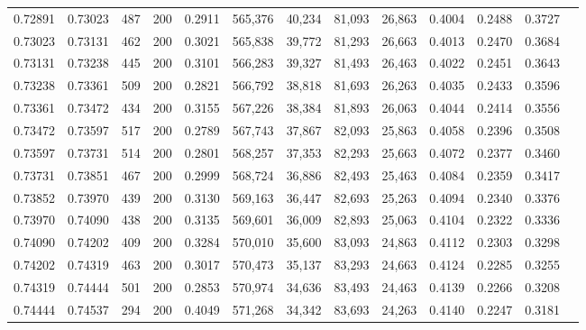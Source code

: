 \begin{tabular}{rrrrrrrrrrrrr}
0.72891 & 0.73023 &   487 & 200 &                                     0.2911 & 565,376 &  40,234 &  81,093 &  26,863 & 0.4004 & 0.2488 & 0.3727 \\
0.73023 & 0.73131 &   462 & 200 &                                     0.3021 & 565,838 &  39,772 &  81,293 &  26,663 & 0.4013 & 0.2470 & 0.3684 \\
0.73131 & 0.73238 &   445 & 200 &                                     0.3101 & 566,283 &  39,327 &  81,493 &  26,463 & 0.4022 & 0.2451 & 0.3643 \\
0.73238 & 0.73361 &   509 & 200 &                                     0.2821 & 566,792 &  38,818 &  81,693 &  26,263 & 0.4035 & 0.2433 & 0.3596 \\
0.73361 & 0.73472 &   434 & 200 &                                     0.3155 & 567,226 &  38,384 &  81,893 &  26,063 & 0.4044 & 0.2414 & 0.3556 \\
0.73472 & 0.73597 &   517 & 200 &                                     0.2789 & 567,743 &  37,867 &  82,093 &  25,863 & 0.4058 & 0.2396 & 0.3508 \\
0.73597 & 0.73731 &   514 & 200 &                                     0.2801 & 568,257 &  37,353 &  82,293 &  25,663 & 0.4072 & 0.2377 & 0.3460 \\
0.73731 & 0.73851 &   467 & 200 &                                     0.2999 & 568,724 &  36,886 &  82,493 &  25,463 & 0.4084 & 0.2359 & 0.3417 \\
0.73852 & 0.73970 &   439 & 200 &                                     0.3130 & 569,163 &  36,447 &  82,693 &  25,263 & 0.4094 & 0.2340 & 0.3376 \\
0.73970 & 0.74090 &   438 & 200 &                                     0.3135 & 569,601 &  36,009 &  82,893 &  25,063 & 0.4104 & 0.2322 & 0.3336 \\
0.74090 & 0.74202 &   409 & 200 &                                     0.3284 & 570,010 &  35,600 &  83,093 &  24,863 & 0.4112 & 0.2303 & 0.3298 \\
0.74202 & 0.74319 &   463 & 200 &                                     0.3017 & 570,473 &  35,137 &  83,293 &  24,663 & 0.4124 & 0.2285 & 0.3255 \\
0.74319 & 0.74444 &   501 & 200 &                                     0.2853 & 570,974 &  34,636 &  83,493 &  24,463 & 0.4139 & 0.2266 & 0.3208 \\
0.74444 & 0.74537 &   294 & 200 &                                     0.4049 & 571,268 &  34,342 &  83,693 &  24,263 & 0.4140 & 0.2247 & 0.3181 \\

\end{tabular}
